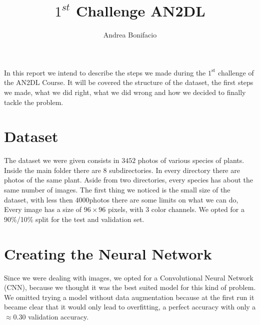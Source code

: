 \documentclass[a4paper,12pt]{article}
\numberwithin{equation}{section}
\begin{document}
\title{\(1^{st}\) Challenge AN2DL}
\author{Andrea Bonifacio}
\maketitle
In this report we intend to describe the steps we made during the \(1^{\text{st}}\) challenge of the AN2DL Course. It will be covered the structure of the dataset, the first steps we made, what we did right, what we did wrong and how we decided to finally tackle the problem.
\section*{Dataset}
The dataset we were given consists in \(3452\) photos of various species of plants. Inside the main folder there are \(8\) subdirectories. In every directory there are photos of the same plant. Aside from two directories, every species has about the same number of images. The first thing we noticed is the small size of the dataset, with less then \(4000\)photos there are some limits on what we can do, Every image has a size of \(96 \times 96\) pixels, with \(3\) color channels. We opted for a 90\%/10\% split for the test and validation set.
\section*{Creating the Neural Network}
Since we were dealing with images, we opted for a Convolutional Neural Network (CNN), because we thought it was the best suited model for this kind of problem. We omitted trying a model without data augmentation because at the first run it became clear that it would only lead to overfitting, a perfect accuracy with only a \(\approx 0.30\) validation accuracy.
\end{document}
